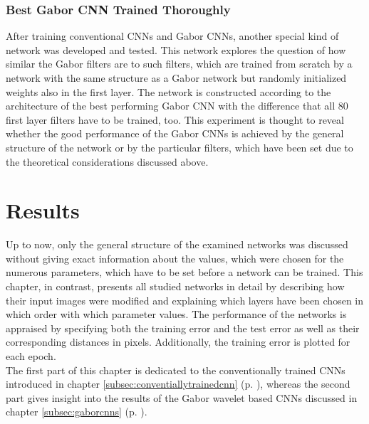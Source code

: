\documentclass[11pt, a4paper]{article}
\newcommand\myref[1]{\ref{#1} (p. \pageref{#1})}
\begin{document}
\subsubsection{Best Gabor CNN Trained Thoroughly}%

After training conventional \acp{CNN} and Gabor \acp{CNN}, another special kind of network was developed and tested. This network explores the question of how similar the Gabor filters are to such filters, which are trained from scratch by a network with the same structure as a Gabor network but randomly initialized weights also in the first layer. The network is constructed according to the architecture of the best performing Gabor \ac{CNN} with the difference that all 80 first layer filters have to be trained, too. This experiment is thought to reveal whether the good performance of the Gabor \acp{CNN} is achieved by the general structure of the network or by the particular filters, which have been set due to the theoretical considerations discussed above.

\newpage


\section{Results}
\label{sec:results}

Up to now, only the general structure of the examined networks was discussed without giving exact information about the values, which were chosen for the numerous parameters, which have to be set before a network can be trained. This chapter, in contrast, presents all studied networks in detail by describing how their input images were modified and explaining which layers have been chosen in which order with which parameter values. The performance of the networks is appraised by specifying both the training error and the test error as well as their corresponding distances in pixels. Additionally, the training error is plotted for each epoch.\\
The first part of this chapter is dedicated to the conventionally trained \acp{CNN} introduced in chapter \myref{subsec:conventiallytrainedcnn}, whereas the second part gives insight into the results of the Gabor wavelet based \acp{CNN} discussed in chapter \myref{subsec:gaborcnns}.
\end{document}

